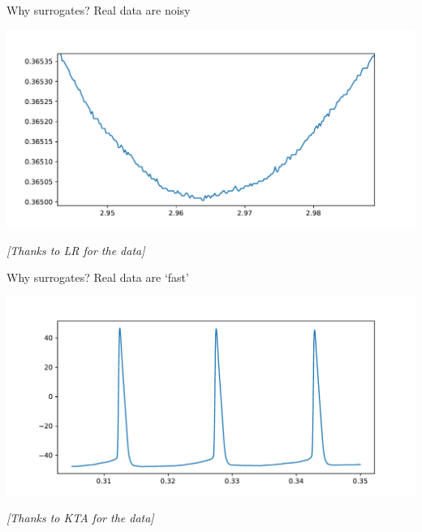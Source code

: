 \documentclass[presentation]{beamer}
\begin{document}
\begin{frame}[label={sec:orga58377a}]{Why surrogates?}
Real data are noisy
\begin{center}
\includegraphics[width=.9\linewidth]{./noisy.pdf}
\end{center}

\begin{center}
\emph{[Thanks to LR for the data]}
\end{center}
\end{frame}

\begin{frame}[label={sec:org5fc270e}]{Why surrogates?}
Real data are `fast'
\begin{center}
\includegraphics[width=.9\linewidth]{./fast.pdf}
\end{center}

\begin{center}
\emph{[Thanks to KTA for the data]}
\end{center}
\end{frame}
\end{document}
